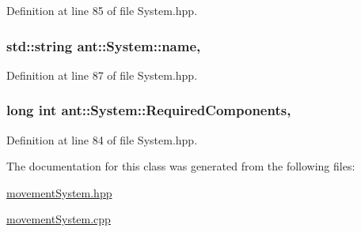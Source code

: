 Definition at line 85 of file System.\+hpp.

\hypertarget{classant_1_1_system_a60b3c00a760a3b4947ab1f1fc534a5b2}{
\subsubsection[{name}]{\setlength{\rightskip}{0pt plus 5cm}std\+::string ant\+::\+System\+::name\hspace{0.3cm}{\ttfamily [protected]}, {\ttfamily [inherited]}}}\label{classant_1_1_system_a60b3c00a760a3b4947ab1f1fc534a5b2}


Definition at line 87 of file System.\+hpp.

\hypertarget{classant_1_1_system_a4ef41cfc496e41ac6730f90629524ec7}{
\subsubsection[{Required\+Components}]{\setlength{\rightskip}{0pt plus 5cm}long int ant\+::\+System\+::\+Required\+Components\hspace{0.3cm}{\ttfamily [protected]}, {\ttfamily [inherited]}}}\label{classant_1_1_system_a4ef41cfc496e41ac6730f90629524ec7}


Definition at line 84 of file System.\+hpp.



The documentation for this class was generated from the following files\+:\begin{DoxyCompactItemize}
\item 
\hyperlink{movement_system_8hpp}{movement\+System.\+hpp}\item 
\hyperlink{movement_system_8cpp}{movement\+System.\+cpp}\end{DoxyCompactItemize}
